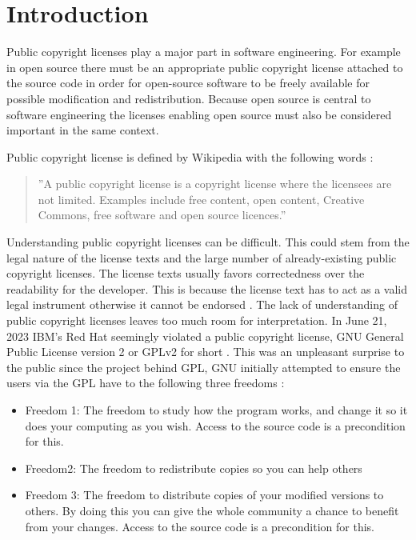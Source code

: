 \chapter{Introduction\label{intro}}

Public copyright licenses play a major part in software engineering. For example in open source there must be an appropriate public copyright license attached to the source code in order for open-source software to be freely available for possible modification and redistribution. Because open source is central to software engineering the licenses enabling open source must also be considered important in the same context.

Public copyright license is defined by Wikipedia with the following words \citep{wiki:publiclicenses}:
\begin{quote}
	''A public copyright license is a copyright license where the licensees are not limited. Examples include free content, open content, Creative Commons, free software and open source licences.''
\end{quote}

Understanding public copyright licenses can be difficult. This could stem from the legal nature of the license texts and the large number of already-existing public copyright licenses. The license texts usually favors correctedness over the readability for the developer. This is because the license text has to act as a valid legal instrument otherwise it cannot be endorsed \citep{ferguson2006gpl}. The lack of understanding of public copyright licenses leaves too much room for interpretation. In June 21, 2023 IBM's Red Hat seemingly violated a public copyright license, GNU General Public License version 2 or GPLv2 for short \citep{sfc:rhel} \citep{ibm:rhel}. This was an unpleasant surprise to the public since the project behind GPL, GNU initially attempted to ensure the users via the GPL have to the following three freedoms \citep{gnu:free}:
\begin{itemize}
	\item Freedom 1:	The freedom to study how the program works, and change it so it does your computing as you wish. Access to the source code is a precondition for this.
	\item Freedom2: The freedom to redistribute copies so you can help others
	\item Freedom 3:	The freedom to distribute copies of your modified versions to others. By doing this you can give the whole community a chance to benefit from your changes. Access to the source code is a precondition for this.
\end{itemize}

